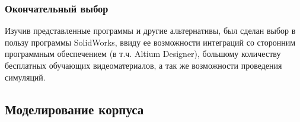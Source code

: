 \subsubsection{Окончательный выбор}
Изучив представленные программы и другие альтернативы, был сделан выбор в пользу программы SolidWorks, ввиду ее возможности интеграций со сторонним программным обеспечением (в т.ч. Altium Designer), большому количеству бесплатных обучающих видеоматериалов\cite{sw_docs}, а так же возможности проведения симуляций.

\subsection{Моделирование корпуса}